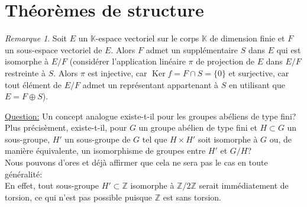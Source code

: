 \documentclass{report}
\newcommand{\Z}{\mathbb{Z}}
\newcommand{\K}{\mathbb{K}}
\renewcommand{\ker}{\mathop{\mathrm{Ker}}\nolimits}
\theoremstyle{definition}
\theoremstyle{remark}
\newtheorem{rem}[defi]{Remarque}
\newcommand{\ques}{\underline{Question:} }
\begin{document}
\section{Théorèmes de structure}

\begin{rem}
Soit $E$ un $\K$-espace vectoriel sur le corps $\K$ de dimension finie et $F$ un sous-espace vectoriel de $E$. Alors $F$ admet un supplémentaire $S$ dans $E$ qui est isomorphe \`a $E/F$ (consid\'erer l'application linéaire $\pi$ de projection de $E$ dans $E/F$ restreinte à $S$. Alors $\pi$ est  injective, car $\ker f = F \cap S =\{0\}$ et surjective, car tout élément de $E/F$ admet un représentant appartenant à $S$ en utilisant que $E=F\oplus S$).\bigbreak
\end{rem}

\ques Un concept analogue existe-t-il pour les groupes ab\'eliens de type fini?\medbreak
Plus pr\'ecis\`ement, existe-t-il, pour $G$ un groupe abélien de type fini et $H\subset G$ un sous-groupe, $H'$ un sous-groupe de $G$ tel que $H \times H'$ soit isomorphe \`a $G$ ou, de mani\`ere \'equivalente, un isomorphisme de groupes entre $H'$ et $G/H$?\\

Nous pouvons d'ores et d\'ej\`a affirmer que cela ne sera pas le cas en toute g\'en\'eralit\'e:\\
En effet, tout sous-groupe $H'\subset\Z$ isomorphe à $\Z/2\Z$ serait immédiatement de torsion, ce qui n'est pas possible puisque $\Z$ est sans torsion.\bigbreak
\end{document}
